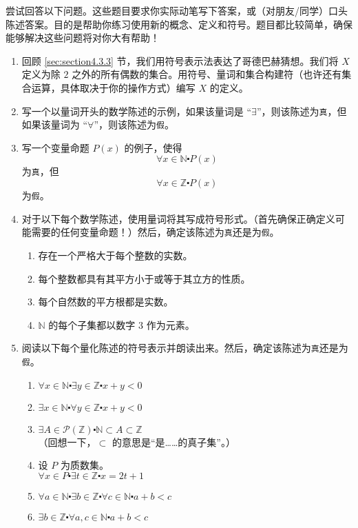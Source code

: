 尝试回答以下问题。这些题目要求你实际动笔写下答案，或（对朋友/同学）口头陈述答案。目的是帮助你练习使用新的概念、定义和符号。题目都比较简单，确保能够解决这些问题将对你大有帮助！

\begin{enumerate}[label=(\arabic*)]
    \item 回顾 \ref{sec:section4.3.3} 节，我们用符号表示法表达了哥德巴赫猜想。我们将 $X$ 定义为除 $2$ 之外的所有偶数的集合。用符号、量词和集合构建符（也许还有集合运算，具体取决于你的操作方式）编写 $X$ 的定义。
    \item 写一个以量词开头的数学陈述的示例，如果该量词是 ``$\exists$''，则该陈述为\verb|真|，但如果该量词为  ``$\forall$''，则该陈述为\verb|假|。
    \item 写一个变量命题 $P(x)$ 的例子，使得
        \[\forall x \in \mathbb{N} \centerdot P(x)\]
        为\verb|真|，但
        \[\forall x \in \mathbb{Z} \centerdot P(x)\]
        为\verb|假|。
    \item 对于以下每个数学陈述，使用量词将其写成符号形式。（首先确保正确定义可能需要的任何变量命题！）然后，确定该陈述为\verb|真|还是为\verb|假|。
        \begin{enumerate}[label=(\alph*)]
            \item 存在一个严格大于每个整数的实数。
            \item 每个整数都具有其平方小于或等于其立方的性质。
            \item 每个自然数的平方根都是实数。
            \item $\mathbb{N}$ 的每个子集都以数字 $3$ 作为元素。
        \end{enumerate} 
    \item 阅读以下每个量化陈述的符号表示并朗读出来。然后，确定该陈述为\verb|真|还是为\verb|假|。
        \begin{enumerate}[label=(\alph*)]
            \item $\forall x \in \mathbb{N} \centerdot \exists y \in \mathbb{Z} \centerdot x + y < 0$
            \item $\exists x \in \mathbb{N} \centerdot \forall y \in \mathbb{Z} \centerdot x + y < 0$
            \item $\exists A \in \mathcal{P}(\mathbb{Z}) \centerdot \mathbb{N} \subset A \subset \mathbb{Z}$\\（回想一下，$⊂$ 的意思是``是……的真子集''。）
            \item 设 $P$ 为质数集。\\
                    $\forall x \in P \centerdot \exists t \in \mathbb{Z} \centerdot x = 2t + 1$
            \item $\forall a \in \mathbb{N} \centerdot \exists b \in \mathbb{Z} \centerdot \forall c \in \mathbb{N} \centerdot a + b < c$
            \item $\exists b \in \mathbb{Z} \centerdot \forall a, c \in \mathbb{N} \centerdot a + b < c$
        \end{enumerate} 
\end{enumerate}   